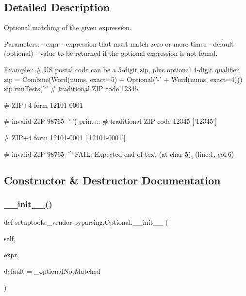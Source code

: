 \subsection{Detailed Description}
\begin{DoxyVerb}Optional matching of the given expression.

Parameters:
 - expr - expression that must match zero or more times
 - default (optional) - value to be returned if the optional expression is not found.

Example::
    # US postal code can be a 5-digit zip, plus optional 4-digit qualifier
    zip = Combine(Word(nums, exact=5) + Optional('-' + Word(nums, exact=4)))
    zip.runTests('''
        # traditional ZIP code
        12345
        
        # ZIP+4 form
        12101-0001
        
        # invalid ZIP
        98765-
        ''')
prints::
    # traditional ZIP code
    12345
    ['12345']

    # ZIP+4 form
    12101-0001
    ['12101-0001']

    # invalid ZIP
    98765-
         ^
    FAIL: Expected end of text (at char 5), (line:1, col:6)
\end{DoxyVerb}
 

\subsection{Constructor \& Destructor Documentation}
\mbox{\label{classsetuptools_1_1__vendor_1_1pyparsing_1_1Optional_a03acdb87a4205db8e25a4ded39b732ce}} 
\subsubsection{\texorpdfstring{\+\_\+\+\_\+init\+\_\+\+\_\+()}{\_\_init\_\_()}}
{\footnotesize\ttfamily def setuptools.\+\_\+vendor.\+pyparsing.\+Optional.\+\_\+\+\_\+init\+\_\+\+\_\+ (\begin{DoxyParamCaption}\item[{}]{self,  }\item[{}]{expr,  }\item[{}]{default = {\ttfamily \+\_\+optionalNotMatched} }\end{DoxyParamCaption})}




